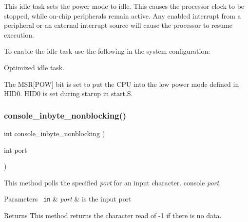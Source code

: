 This idle task sets the power mode to idle. This causes the processor clock to be stopped, while on-\/chip peripherals remain active. Any enabled interrupt from a peripheral or an external interrupt source will cause the processor to resume execution.

To enable the idle task use the following in the system configuration\+:


\begin{DoxyCode}{0}
\DoxyCodeLine{\textcolor{preprocessor}{\#include <bsp.h>}}
\DoxyCodeLine{}
\DoxyCodeLine{\textcolor{preprocessor}{\#define CONFIGURE\_INIT}}
\DoxyCodeLine{}
\DoxyCodeLine{\textcolor{preprocessor}{\#define CONFIGURE\_IDLE\_TASK\_BODY bsp\_idle\_thread}}
\DoxyCodeLine{}
\end{DoxyCode}


Optimized idle task.

The M\+SR\mbox{[}P\+OW\mbox{]} bit is set to put the C\+PU into the low power mode defined in H\+I\+D0. H\+I\+D0 is set during starup in start.\+S. \mbox{\label{group__RTEMSBSPsSPARCLEON2_ga33017a80c39bdce884e201734ceb023d}} 
\subsubsection{\texorpdfstring{console\_inbyte\_nonblocking()}{console\_inbyte\_nonblocking()}}
{\footnotesize\ttfamily int console\+\_\+inbyte\+\_\+nonblocking (\begin{DoxyParamCaption}\item[{int}]{port }\end{DoxyParamCaption})}

This method polls the specified {\itshape port} for an input character. console {\itshape port}.


\begin{DoxyParams}[1]{Parameters}
\mbox{\texttt{ in}}  & {\em port} & is the input port\\
\hline
\end{DoxyParams}
\begin{DoxyReturn}{Returns}
This method returns the character read of -\/1 if there is no data. 
\end{DoxyReturn}
\mbox{\label{group__RTEMSBSPsSPARCLEON2_gab3388042c56b34c40be81fd5f028d97e}} 
